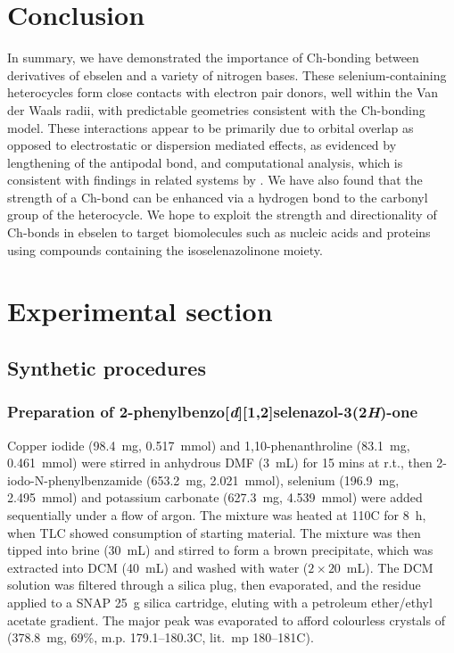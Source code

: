 \begin{refsection}
    \section{Conclusion}
    In summary, we have demonstrated the importance of Ch-bonding between derivatives of ebselen  and a variety of nitrogen bases.
    These selenium-containing heterocycles form close contacts with electron pair donors, well within the Van der Waals radii, with predictable geometries consistent with the Ch-bonding model.
    These interactions appear to be primarily due to orbital overlap as opposed to electrostatic or dispersion mediated effects, as evidenced by lengthening of the antipodal  bond, and computational analysis, which is consistent with findings in related systems by \citeauthor{Pascoe2017}.\autocite{Pascoe2017}
    We have also found that the strength of a Ch-bond can be enhanced via a hydrogen bond to the carbonyl group of the heterocycle.
    We hope to exploit the strength and directionality of Ch-bonds in ebselen to target biomolecules such as nucleic acids and proteins using compounds containing the isoselenazolinone moiety.
    
    \section{Experimental section}
    
    \subsection{Synthetic procedures}
    
    \subsubsection[Preparation of \refcmpd{ebs}]{Preparation of 2-phenylbenzo[\textit{d}][1,2]selenazol-3(2\textit{H})-one }
    
    Copper iodide (98.4~mg, 0.517~mmol) and 1,10-phenanthroline (83.1~mg, 0.461~mmol) were stirred in anhydrous DMF (3~mL) for 15 mins at r.t., then 2-iodo-N-phenylbenz\-amide (653.2~mg, 2.021~mmol), selenium (196.9~mg, 2.495~mmol) and potassium carbonate (627.3~mg, 4.539~mmol) were added sequentially under a flow of argon.
    The mixture was heated at 110\degree{}C for 8~h, when TLC showed consumption of starting material.
    The mixture was then tipped into brine (30~mL) and stirred to form a brown precipitate, which was extracted into DCM (40~mL) and washed with water ($ 2 \times 20 $~mL).
    The DCM solution was filtered through a silica plug, then evaporated, and the residue applied to a SNAP 25~g silica cartridge, eluting with a petroleum ether/ethyl acetate gradient.
    The major peak was evaporated to afford colourless crystals of  (378.8~mg, 69\%, m.p. 179.1--180.3\degree{}C, lit.\ mp 180--181\degree{}C).\autocite{Bhabak2010} 
    

\end{refsection}
